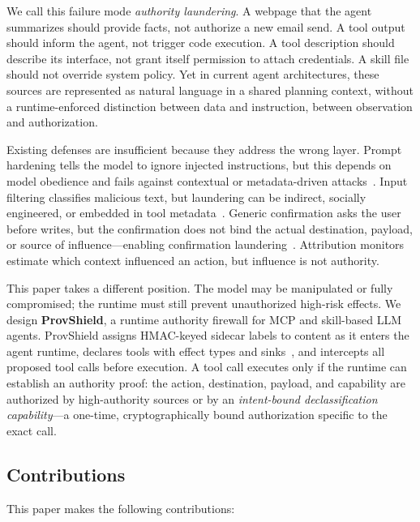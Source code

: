 \documentclass[sigconf,anonymous,review]{acmart}
\begin{document}
We call this failure mode \emph{authority laundering}. A webpage that the agent summarizes should provide facts, not authorize a new email send. A tool output should inform the agent, not trigger code execution. A tool description should describe its interface, not grant itself permission to attach credentials. A skill file should not override system policy. Yet in current agent architectures, these sources are represented as natural language in a shared planning context, without a runtime-enforced distinction between data and instruction, between observation and authorization.

Existing defenses are insufficient because they address the wrong layer. Prompt hardening tells the model to ignore injected instructions, but this depends on model obedience and fails against contextual or metadata-driven attacks~\cite{openai_agent_prompt_injection_defense}. Input filtering classifies malicious text, but laundering can be indirect, socially engineered, or embedded in tool metadata~\cite{greshake2023indirect}. Generic confirmation asks the user before writes, but the confirmation does not bind the actual destination, payload, or source of influence---enabling confirmation laundering~\cite{perez2022ignore}. Attribution monitors estimate which context influenced an action, but influence is not authority.

This paper takes a different position. The model may be manipulated or fully compromised; the runtime must still prevent unauthorized high-risk effects. We design \textbf{ProvShield}, a runtime authority firewall for MCP and skill-based LLM agents. ProvShield assigns HMAC-keyed sidecar labels to content as it enters the agent runtime, declares tools with effect types and sinks~\cite{denning1976lattice,myers1997decentralized}, and intercepts all proposed tool calls before execution. A tool call executes only if the runtime can establish an authority proof: the action, destination, payload, and capability are authorized by high-authority sources or by an \emph{intent-bound declassification capability}---a one-time, cryptographically bound authorization specific to the exact call.

\subsection{Contributions}

This paper makes the following contributions:
\end{document}
